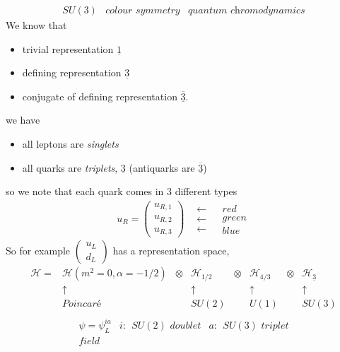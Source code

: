 \begin{equation}
\begin{matrix}
    SU(3) & \textit{colour symmetry} & \textit{quantum chromodynamics}
\end{matrix}
\end{equation}
We know that 
\begin{itemize}
    \item trivial representation $\underline{1}$
    \item defining representation $\underline{3}$
    \item conjugate of defining representation $\underline{\overline{3}}$.
\end{itemize}
we have 
\begin{itemize}
    \item all leptons are \textit{singlets}
    \item all quarks are \textit{triplets}, $\underline{3}$ (antiquarks are $\underline{\overline{3}}$)
\end{itemize}
so we note that each quark comes in 3 different types
\begin{equation}
\begin{matrix}
        u_R = \begin{pmatrix}
        u_{R,1}\\
        u_{R,2}\\
        u_{R,3}
    \end{pmatrix} & \begin{matrix}
        \longleftarrow\\
        \longleftarrow\\
        \longleftarrow
    \end{matrix} &
    \begin{matrix}
        \textit{red}\\
        \textit{green}\\
        \textit{blue}
    \end{matrix}
\end{matrix}    
\end{equation}
So for example $\begin{pmatrix}u_L\\d_L\end{pmatrix}$ has a representation space, 
\begin{equation}
\begin{matrix}
    \mathcal{H} = & \mathcal{H}(m^2=0,\alpha=-1/2)&\otimes&\mathcal{H}_{1/2}&\otimes&\mathcal{H}_{4/3}&\otimes&\mathcal{H}_{\underline{3}}\\
     & \uparrow& &\uparrow& &\uparrow& &\uparrow\\
     & \textit{Poincar\'e}& &SU(2)& &U(1)& &SU(3)\\
\end{matrix}
\end{equation}
\begin{equation}
    \begin{matrix}
        \psi= \psi^{ia}_{L} & i:\ \ SU(2) \textit{ doublet} & a: \ \ SU(3) \textit{ triplet}\\
        \textit{field}
    \end{matrix}
\end{equation}
